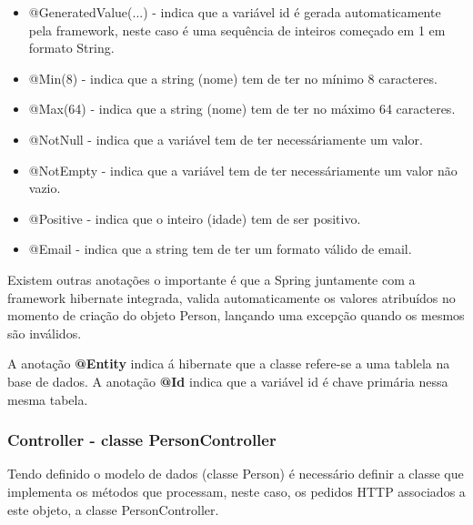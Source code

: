 \begin{itemize}
    
    \item @GeneratedValue(...) - indica que a variável id é gerada automaticamente pela framework, neste caso é uma sequência de inteiros começado em 1 em formato String.
    
    \item @Min(8) - indica que a string (nome) tem de ter no mínimo 8 caracteres.
    
    \item @Max(64) - indica que a string (nome) tem de ter no máximo 64 caracteres.
    
    \item @NotNull - indica que a variável tem de ter necessáriamente um valor.
    
    \item @NotEmpty - indica que a variável tem de ter necessáriamente um valor não vazio.
    
    \item @Positive - indica que o inteiro (idade) tem de ser positivo.
    
    \item @Email - indica que a string tem de ter um formato válido de email.
    
\end{itemize}

\hspace{5mm} Existem outras anotações o importante é que a Spring juntamente com a framework hibernate integrada, valida automaticamente os valores atribuídos no momento de criação do objeto Person, lançando uma excepção quando os mesmos são inválidos.

\hspace{5mm} A anotação \textbf{@Entity} indica á hibernate que a classe refere-se a uma tablela na base de dados. A anotação \textbf{@Id} indica que a variável id é chave primária nessa mesma tabela.

\subsubsection{Controller - classe PersonController}

\hspace{5mm} Tendo definido o modelo de dados (classe Person) é necessário definir a classe que implementa os métodos que processam, neste caso, os pedidos HTTP associados a este objeto, a classe PersonController.



